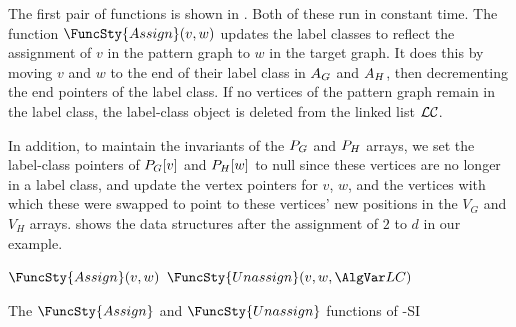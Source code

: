The first pair of functions is shown in .
Both of these run in constant time.
The function $\FuncSty{Assign}(v,w)$ updates the label classes to reflect
the assignment of $v$ in the pattern graph to $w$ in the target graph.  It 
does this by moving $v$ and $w$ to the end of their label class in
$A_G$ and $A_H$, then decrementing the end pointers of the label class.
If no vertices of the pattern graph remain in the label class, the label-class
object is deleted from the linked list $\mathcal{LC}$.

In addition, to maintain the invariants of
the $P_G$ and $P_H$ arrays, we set the label-class pointers of
$P_G[v]$ and $P_H[w]$ to null since these vertices
are no longer in a label class, and update the vertex pointers
for $v$, $w$, and the vertices with which these were swapped to point to these
vertices' new positions in the $V_G$ and $V_H$ arrays.
 shows the data structures after the assignment
of $2$ to $d$ in our example.

\begin{algorithm}[htb]
\AlgorithmFontSize
\DontPrintSemicolon
\nl $\FuncSty{Assign}(v,w)$ \;
\nl {}
\;
\nl $\FuncSty{Unassign}(v,w,\LC)$ \;
\nl {}
\caption{The $\FuncSty{Assign}$ and $\FuncSty{Unassign}$ functions of \McSplit-SI}
\label{McSplitSIAlgAssign}
\end{algorithm}

